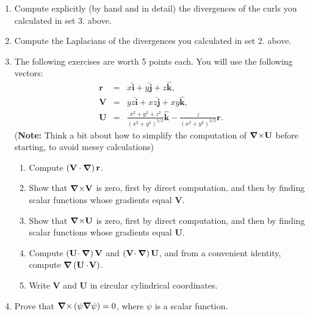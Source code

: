 \documentclass[fleqn]{article}
\newcommand{\grad}[1]{\mbox{\boldmath $\nabla$}\mbox{$#1$}}
\begin{document}
\begin{enumerate}
    \item Compute explicitly (by hand and in detail) the divergences of the curls you calculated in set 3. above.   
    
    \item Compute the Laplacians of the divergences you calculated in set 2. above.
    
    
    \item The following exercises are worth 5 points each. You will use the following vectors: 
      \begin{eqnarray*}
      \mathbf{r} &=&x\mathbf{\hat{i}}+y\mathbf{\hat{j}}+z\mathbf{\hat{k},} \\
      \mathbf{V} &=&yz\mathbf{\hat{i}}+xz\mathbf{\hat{j}}+xy\mathbf{\hat{k},} \\
      \mathbf{U} &=&\frac{x^{2}+y^{2}+z^{2}}{\left( x^{2}+y^{2}\right) ^{3/2}}
      \mathbf{\hat{k}-}\frac{z}{\left( x^{2}+y^{2}\right) ^{3/2}}\mathbf{r.}
      \end{eqnarray*}
    ({\bf Note:} Think a bit about how to simplify the computation of
    $\mathbf{\grad \times U}$ before starting, to avoid messy calculations)
    \begin{enumerate}
    \item Compute $\left( \mathbf{V\cdot \grad{}}\right) \mathbf{r}$.
    
    \item Show that $\mathbf{\grad \times V}$ is zero, first by direct computation, and then by finding scalar functions whose gradients equal $\mathbf{V}$.
    
    \item Show that $\mathbf{\grad \times U}$ is zero, first by direct computation, and then by finding scalar functions whose gradients equal $\mathbf{U}$. 
    
    \item Compute $\left( \mathbf{U \! \cdot \grad{} }\right) \mathbf{V}$ and $\left( \mathbf{V \! \cdot \grad{} }\right) \mathbf{U}$, and from a
    convenient identity, compute $\grad{}\left( \mathbf{U\cdot
    \! V}\right) $.
    
    \item Write $\mathbf{V}$ and $\mathbf{U}$ in circular cylindrical
    coordinates.
    \end{enumerate}
    
    \item Prove that $\mathbf{\grad \times }\left( \psi \mathbf{\grad{} }\psi \right) =0$, where $\psi $ is a scalar function.
    

\end{enumerate}
\end{document}
